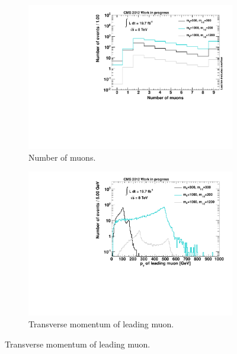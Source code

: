\begin{figure}[!htbp]
  \centering
  \begin{subfigure}[b]{0.495\textwidth}
    \centering
    \includegraphics[width=\textwidth]{plots/muo_n.pdf}
    \caption{Number of muons.\label{fig:muo_n}}
  \end{subfigure}
  \begin{subfigure}[b]{0.495\textwidth}
    \centering
    \includegraphics[width=\textwidth]{plots/sig_muo_pt1.pdf}
    \caption{Transverse momentum of leading muon.\label{fig:sig_muo_pt1}}
  \end{subfigure}
\end{figure}

